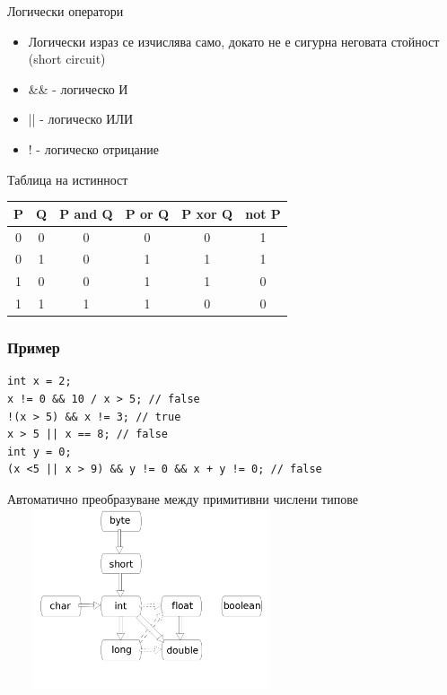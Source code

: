 \documentclass{beamer}
\begin{document}
\begin{frame}{Логически оператори}
  \transdissolve
  \begin{itemize}
  \item   Логически израз се изчислява само, докато
    не е сигурна неговата стойност (short
    circuit) \pause
  \item \&\& - логическо И
  \item || - логическо ИЛИ
  \item ! - логическо отрицание
  \end{itemize}
\end{frame}

\begin{frame}{Таблица на истинност}
  \transdissolve 
  \begin{tabular}{|c|c|c|c|c|c|}
    \hline
    P & Q & P and Q & P or Q & P xor Q & not P \\
    \hline
    0 & 0 & 0 & 0 & 0 & 1 \\
    \hline
    0 & 1 & 0 & 1 & 1 & 1 \\
    \hline
    1 & 0 & 0 & 1 & 1 & 0 \\
    \hline
    1 & 1 & 1 & 1 & 0 & 0 \\
    \hline
  \end{tabular} 
\end{frame}

\begin{frame}[fragile]
  \frametitle{Пример}
  \transdissolve
\begin{lstlisting}
int x = 2;
x != 0 && 10 / x > 5; // false
!(x > 5) && x != 3; // true
x > 5 || x == 8; // false
int y = 0;
(x <5 || x > 9) && y != 0 && x + y != 0; // false
\end{lstlisting}
\end{frame}

\begin{frame}{{Автоматично преобразуване между примитивни числени типове}}
  \transdissolve
  \includegraphics[height=200px, width=320px]{images/conversion.png}
\end{frame}
\end{document}
